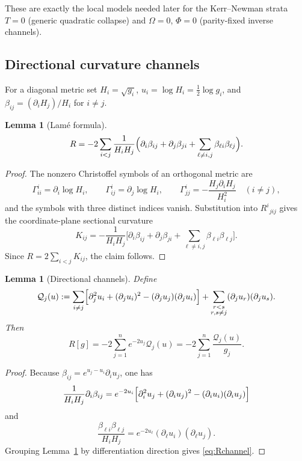 \documentclass[11pt,a4paper]{article}
\newtheorem{lemma}[theorem]{Lemma}
\theoremstyle{definition}
\theoremstyle{remark}
\begin{document}
These are exactly the local models needed later for the Kerr--Newman strata
\(T=0\) (generic quadratic collapse) and \(\Omega=0\), \(\Phi=0\) (parity-fixed
inverse channels).

\subsection{Directional curvature channels}

For a diagonal metric set \(H_i=\sqrt{g_i}\), \(u_i=\log H_i=\tfrac12\log g_i\),
and \(\beta_{ij}=(\partial_i H_j)/H_i\) for \(i\neq j\).

\begin{lemma}[Lam\'e formula]
\label{lem:lame}
\[
R
=
-2\sum_{i<j}\frac{1}{H_iH_j}
\Bigl(
\partial_i\beta_{ij}+\partial_j\beta_{ji}
+\sum_{\ell\neq i,j}\beta_{\ell i}\beta_{\ell j}
\Bigr).
\]
\end{lemma}

\begin{proof}
The nonzero Christoffel symbols of an orthogonal metric are
\[
\Gamma^i_{ii}=\partial_i\log H_i,
\qquad
\Gamma^i_{ij}=\partial_j\log H_i,
\qquad
\Gamma^i_{jj}=-\frac{H_j\partial_i H_j}{H_i^2}
\quad(i\neq j),
\]
and the symbols with three distinct indices vanish. Substitution into
\(R^i{}_{jij}\) gives the coordinate-plane sectional curvature
\[
K_{ij}
=
-\frac{1}{H_iH_j}
\Biggl[
\partial_i\beta_{ij}
+\partial_j\beta_{ji}
+\sum_{\ell\neq i,j}\beta_{\ell i}\beta_{\ell j}
\Biggr].
\]
Since \(R=2\sum_{i<j}K_{ij}\), the claim follows.
\end{proof}

\begin{lemma}[Directional channels]
\label{lem:channels}
Define
\begin{equation}
\mathcal Q_j(u)
:=
\sum_{i\neq j}
\Bigl[
\partial_j^2u_i+(\partial_ju_i)^2-(\partial_ju_j)(\partial_ju_i)
\Bigr]
+
\sum_{\substack{r<s\\r,s\neq j}}
(\partial_ju_r)(\partial_ju_s).
\label{eq:Qj}
\end{equation}
Then
\begin{equation}
\boxed{
R[g]
=
-2\sum_{j=1}^{n}e^{-2u_j}\mathcal Q_j(u)
=
-2\sum_{j=1}^{n}\frac{\mathcal Q_j(u)}{g_j}.
}
\label{eq:Rchannel}
\end{equation}
\end{lemma}

\begin{proof}
Because \(\beta_{ij}=e^{u_j-u_i}\partial_iu_j\), one has
\[
\frac{1}{H_iH_j}\partial_i\beta_{ij}
=
e^{-2u_i}
\Bigl[
\partial_i^2u_j
+(\partial_iu_j)^2
-(\partial_iu_i)(\partial_iu_j)
\Bigr]
\]
and
\[
\frac{\beta_{\ell i}\beta_{\ell j}}{H_iH_j}
=
e^{-2u_\ell}(\partial_\ell u_i)(\partial_\ell u_j).
\]
Grouping Lemma~\ref{lem:lame} by differentiation direction gives
\eqref{eq:Rchannel}.
\end{proof}
\end{document}
